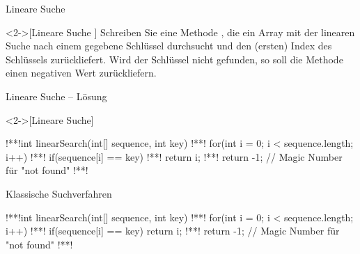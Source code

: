 \ifull
\begin{frame}[c]{Lineare Suche}
    \begin{exercise}<2->[Lineare Suche ]
        \pause{}Schreiben Sie eine Methode , die ein Array mit der linearen Suche nach einem gegebene Schlüssel durchsucht und den (ersten) Index des Schlüssels zurückliefert.
        Wird der Schlüssel nicht gefunden, so soll die Methode einen negativen Wert zurückliefern.
    \end{exercise}
\end{frame}

\begin{frame}[fragile,c]{Lineare Suche -- Lösung}
    \begin{solve}<2->[Lineare Suche]
\begin{plainjava}
!**!int linearSearch(int[] sequence, int key){
!**!    for(int i = 0; i < sequence.length; i++)
!**!        if(sequence[i] == key)
!**!            return i;
!**!    return -1; // Magic Number für "not found"
!**!}
\end{plainjava}
    \end{solve}
\end{frame}
\else
\begin{frame}[fragile,c]{Klassische Suchverfahren}
\begin{plainjava}
!**!int linearSearch(int[] sequence, int key){
!**!    for(int i = 0; i < sequence.length; i++)
!**!        if(sequence[i] == key) return i;
!**!    return -1; // Magic Number für "not found"
!**!}
\end{plainjava}
\end{frame}
\fi

